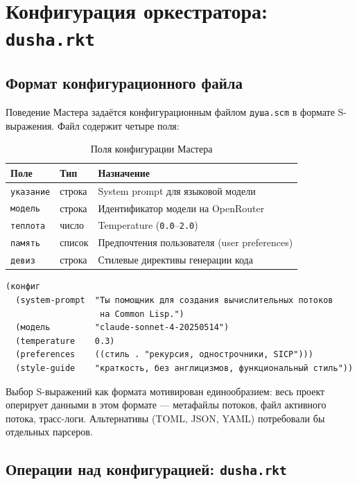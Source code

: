 \documentclass[11pt,a4paper]{article}
\begin{document}
\section{Конфигурация оркестратора: \texttt{dusha.rkt}}

\subsection{Формат конфигурационного файла}

Поведение Мастера задаётся конфигурационным файлом \texttt{душа.scm} в формате
S-выражения. Файл содержит четыре поля:

\begin{table}[H]
\centering
\begin{tabular}{lll}
\toprule
\textbf{Поле} & \textbf{Тип} & \textbf{Назначение} \\
\midrule
\texttt{указание} & строка & System prompt для языковой модели \\
\texttt{модель}   & строка & Идентификатор модели на OpenRouter \\
\texttt{теплота}  & число  & Temperature (\texttt{0.0}--\texttt{2.0}) \\
\texttt{память}   & список & Предпочтения пользователя (user preferences) \\
\texttt{девиз}    & строка & Стилевые директивы генерации кода \\
\bottomrule
\end{tabular}
\caption{Поля конфигурации Мастера}
\end{table}

\begin{lstlisting}[language=Racket, caption={Конфигурационный файл \texttt{душа.scm}}]
(конфиг
  (system-prompt  "Ты помощник для создания вычислительных потоков
                   на Common Lisp.")
  (модель         "claude-sonnet-4-20250514")
  (temperature    0.3)
  (preferences    ((стиль . "рекурсия, однострочники, SICP")))
  (style-guide    "краткость, без англицизмов, функциональный стиль"))
\end{lstlisting}

Выбор S-выражений как формата мотивирован единообразием: весь проект оперирует
данными в этом формате — метафайлы потоков, файл активного потока, трасс-логи.
Альтернативы (TOML, JSON, YAML) потребовали бы отдельных парсеров.

\subsection{Операции над конфигурацией: \texttt{dusha.rkt}}
\end{document}
